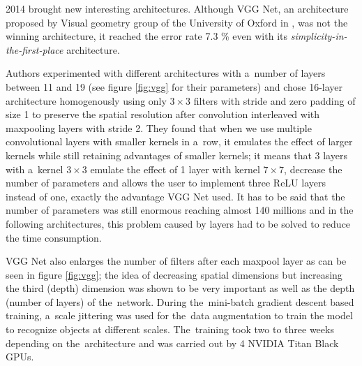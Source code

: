  2014 brought new interesting architectures. Although VGG Net, an 
architecture proposed by Visual geometry group of the University of Oxford in 
\cite{vgg}, was not the winning architecture, it reached the error rate 7.3 \% 
even with its \textit{simplicity-in-the-first-place} architecture.

Authors experimented with different architectures with a~number of layers
between 11 and 19 (see figure \ref{fig:vgg} for their parameters) and chose
16-layer architecture homogenously using only $3 \times 3$ filters with stride
and zero padding of size 1 to preserve the spatial resolution after convolution
interleaved with maxpooling layers with stride 2. They found that when we use 
multiple convolutional layers with smaller kernels in a~row, it emulates the 
effect of larger kernels while still retaining advantages of smaller kernels;
it means that 3 layers with a~kernel $3 \times 3$ emulate the effect of 1 layer
with kernel $7 \times 7$, decrease the number of parameters and allows the user
to implement three ReLU layers instead of one, exactly the advantage VGG Net
used. It has to be said that the number of parameters was still enormous
reaching almost 140 millions and in the following architectures, this problem
caused by  layers had to be solved to reduce the time consumption.

VGG Net also enlarges the number of filters after each maxpool layer as can be 
seen in figure \ref{fig:vgg}; the idea of decreasing spatial dimensions but 
increasing the third (depth) dimension was shown to be very important as well
as the depth (number of layers) of the~network. During the~mini-batch gradient 
descent based training, a~scale jittering was used for the~data augmentation to
train the model to recognize objects at different scales. The~training took two
to three weeks depending on the~architecture and was carried out by 4 NVIDIA 
Titan Black GPUs.

